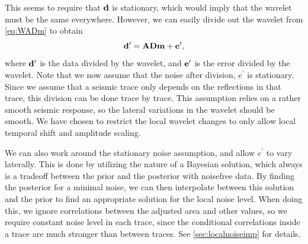 This seems to require that $\mathbf{d}$ is stationary, which would imply that the wavelet must be the same everywhere. However, we can easily divide out the wavelet from \autoref{eq:WADm} to obtain
\begin{equation}
\label{eq:ADm}
\mathbf{d^\prime} = \mathbf{A}\mathbf{D}\mathbf{m} + \mathbf{e^\prime},
\end{equation}
where $\mathbf{d^\prime}$ is the data divided by the wavelet, and $\mathbf{e^\prime}$ is the error divided by the wavelet. Note that we now assume that the noise after division, $e^\prime$ is stationary. Since we assume that a seismic trace only depends on the reflections in that trace, this division can be done trace by trace. This assumption relies on a rather smooth seismic response, so the lateral variations in the wavelet should be smooth. We have chosen to restrict the local wavelet changes to only allow local temporal shift and amplitude scaling.

We can also work around the stationary noise assumption, and allow $e^\prime$ to vary laterally. This is done by utilizing the nature of a Bayesian solution, which always is a tradeoff between the prior and the posterior with noisefree data. By finding the posterior for a minimal noise, we can then interpolate between this solution and the prior to find an appropriate solution for the local noise level. When doing this, we ignore correlations between the adjusted area and other values, so we require constant noise level in each trace, since the conditional correlations inside a trace are much stronger than between traces. See \autoref{sec:localnoiseimp} for details.


